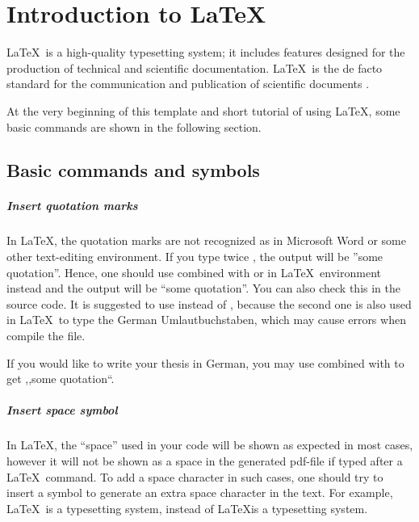 \chapter{Introduction to \LaTeX}

\graphicspath{ {graphics/Chapter1/} }

\LaTeX~is a high-quality typesetting system; it includes features designed for the production of technical and scientific documentation. \LaTeX~is the de facto standard for the communication and publication of scientific documents \cite{LaTeX3Team.}.

At the very beginning of this template and short tutorial of using \LaTeX, some basic commands are shown in the following section.

\section{Basic commands and symbols}

	\paragraph{Insert quotation marks}
	
	In \LaTeX, the quotation marks are not recognized as in Microsoft Word or some other text-editing environment. If you type twice {\color{blue}{\verb|"|}}, the output will be \colorbox{yellow!60}{''some quotation''}. Hence, one should use {\color{blue}{\verb|``|}} combined with {\color{blue}{\verb|"|}} or {\color{blue}{\verb|''|}} in \LaTeX~environment instead and the output will be \colorbox{yellow!60}{``some quotation''}. You can also check this in the source code. It is suggested to use {\color{blue}{\verb|''|}} instead of {\color{blue}{\verb|"|}}, because the second one is also used in \LaTeX~to type the German Umlautbuchstaben, which may cause errors when compile the file.

	If you would like to write your thesis in German, you may use {\color{blue}{\verb|,,|}} combined with {\color{blue}{\verb|``|}} to get \colorbox{yellow!60}{,,some quotation``}.
	
	\paragraph{Insert space symbol}
	
	In \LaTeX, the ``space'' used in your code will be shown as expected in most cases, however it will not be shown as a space in the generated pdf-file if typed after a \LaTeX~command. To add a space character in such cases, one should try to insert a {\color{blue}{\color{blue}{\verb|~|}}} symbol to generate an extra space character in the text. For example, \colorbox{yellow!60}{\LaTeX~is a typesetting system}, instead of \colorbox{yellow!60}{\LaTeX is a typesetting system}.
	
